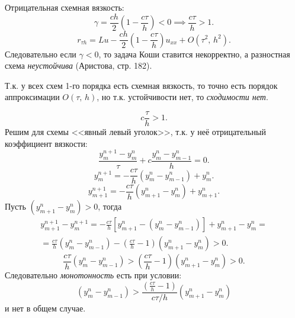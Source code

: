 \documentclass[a4paper]{article}
\begin{document}
\begin{sol}
Отрицательная схемная вязкость:
\[
	\gamma= \frac{c h }{2}\left( 1- \frac{c\tau}{h}
	\right)<0 \implies \frac{c \tau}{h}>1
.\] 
\[
	r_{\tau h}= Lu- \frac{c h}{2}\left( 1- \frac{c\tau}{h} \right) u_{xx} + O\left( \tau^2,\,h^2 \right) 
.\] 
Следовательно если $\gamma<0$, то задача Коши ставится
некорректно, а разностная схема \emph{неустойчива} (Аристова, стр. 182).

Т.\:к. у всех схем  1-го порядка есть схемная вязкость,
то точно есть порядок аппроксимации $O(\tau,\,h)$,
но т.\:к. устойчивости нет, то \emph{сходимости нет}.

\[
c\frac{\tau}{h}>1
.\] 
Решим для схемы <<явный левый уголок>>, т.\:к. у  неё
отрицательный коэффициент вязкости:
\[
\frac{y_m^{n+1}-y_m^n}{\tau}+c \frac{y_m^n-y_{m-1}^n}{h}=0
.\] 
\[
	y_{m}^{n+1}=  -\frac{c\tau}{h} \left( y_m^n
	-y_{m-1}^n\right) + y_{m}^n
.\] 
\[
y_{m+1}^{n+1}= -  \frac{c\tau}{h}
\left(y_{m+1}^n-y_m^n \right) + y_{m+1}^n
.\] 
Пусть $\left( y_{m+1}^n -y_m^n \right) >0$, тогда
\begin{multline*}
y_{m+1}^{n+1}-y_m^{n+1} = -\frac{c \tau}{h}
\left[ y_{m+1}^n - \left( y_m^n -y_{m-1}^n \right)  \right]
+y_{m+1}^n-y_m^n=\\= \frac{c\tau}{h} \left( 
y_{m}^n-y_{m-1}^n\right) -
\left( \frac{c\tau}{h}-1 \right) \left( 
y_{m+1}^n-y_m^n\right) >0
.\end{multline*} 
\[
	\frac{c\tau}{h} \left( y_m^n-y_{m-1}^n \right) 
	>\left( \frac{c\tau}{h}-1 \right) 
	\left( y_{m+1}^n-y_m^n \right) >0
.\] 
Следовательно \emph{монотонность} есть при условии:
\[
	\left( y_m^n-y_{m-1}^n \right) >
	\frac{\left( \frac{c\tau}{h}-1 \right) }{
	c\tau /h}\left( 
y_{m+1}^n-y_m^n\right) 
\]
и нет в общем случае.
\end{sol}
\end{document}
